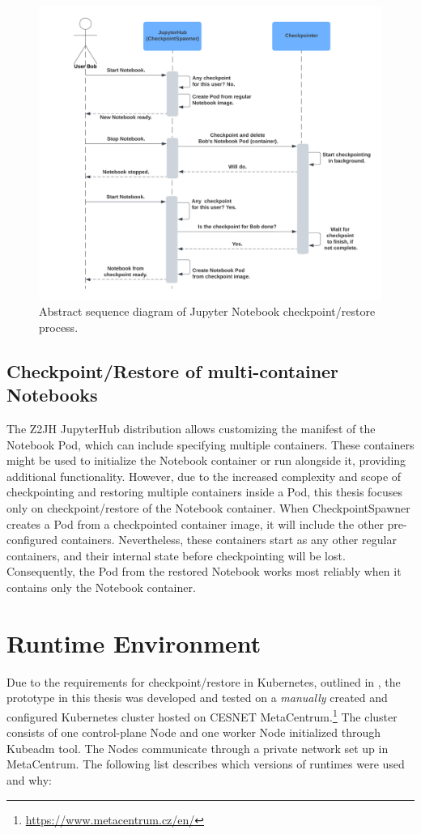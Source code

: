 \documentclass[
  digital,     %
  oneside,     %
  nosansbold,  %
  nocolorbold, %
  lof,         %
  nolot,         %
]{fithesis4}
\begin{document}
\begin{figure}[H]
  \begin{center}
  \includegraphics[width=\textwidth]{figures/checkpoint-highlevel.png}
  \end{center}
  \caption{Abstract sequence diagram of Jupyter Notebook checkpoint/restore process.}
  \label{fig:checkpoint-highlevel}
\end{figure}

\subsection{Checkpoint/Restore of multi-container Notebooks}
The Z2JH JupyterHub distribution allows customizing the manifest of the Notebook Pod, which can include specifying multiple containers. These containers might be used to initialize the Notebook container or run alongside it, providing additional functionality. However, due to the increased complexity and scope of checkpointing and restoring multiple containers inside a Pod, this thesis focuses only on checkpoint/restore of the Notebook container. When CheckpointSpawner creates a Pod from a checkpointed container image, it will include the other pre-configured containers. Nevertheless, these containers start as any other regular containers, and their internal state before checkpointing will be lost. Consequently, the Pod from the restored Notebook works most reliably when it contains only the Notebook container.


\section{Runtime Environment}
\label{sec:runtime-env}
Due to the requirements for checkpoint/restore in Kubernetes, outlined in , the prototype in this thesis was developed and tested on a \emph{manually} created and configured Kubernetes cluster hosted on CESNET MetaCentrum.\footnote{\url{https://www.metacentrum.cz/en/}} The cluster consists of one control-plane Node and one worker Node initialized through Kubeadm tool. The Nodes communicate through a private network set up in MetaCentrum. The following list describes which versions of runtimes were used and why:
\end{document}
